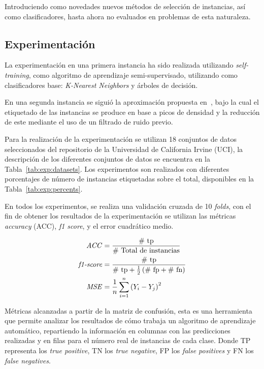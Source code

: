 Introduciendo como novedades nuevos métodos de selección de instancias, así como clasificadores, hasta ahora no evaluados en problemas de esta naturaleza.

\subsection{Experimentación}
La experimentación en una primera instancia ha sido realizada utilizando \textit{self-training}, como algoritmo de aprendizaje semi-supervisado, utilizando como clasificadores base: \textit{K-Nearest Neighbors} y árboles de decisión. 

En una segunda instancia se siguió la aproximación propuesta en~\cite{li2019selfk}, bajo la cual el etiquetado de las instancias se produce en base a picos de densidad y la reducción de este mediante el uso de un filtrado de ruido previo.

Para la realización de la experimentación se utilizan 18 conjuntos de datos seleccionados del repositorio de la Universidad de California Irvine (UCI), la descripción de los diferentes conjuntos de datos se encuentra en la Tabla~\ref{tab:exp:datasets}. Los experimentos son realizados con diferentes porcentajes de número de instancias etiquetadas sobre el total, disponibles en la Tabla~\ref{tab:exp:percents}.

En todos los experimentos, se realiza una validación cruzada de 10 \textit{folds}, con el fin de obtener los resultados de la experimentación se utilizan las métricas \textit{accuracy} (ACC), \textit{f1 score}, y el error cuadrático medio.

\begin{align}
\text{\textit{ACC}} & = \frac{\text{\# tp}}{\text{\# Total de instancias}} \\
\text{\textit{f1-score}} & = \frac{\text{\# tp}}{\text{\# tp} + \frac{1}{2}\left( \text{\# fp} + \text{\# fn}\right)} \\
\text{\textit{MSE}} & = \frac{1}{n} \sum_{i=1}^{n}\left(Y_i - Y_j\right)^2
\end{align}

\noindent Métricas alcanzadas a partir de la matriz de confusión, esta es una herramienta que permite analizar los resultados de cómo trabaja un algoritmo de aprendizaje automático, repartiendo la información en columnas con las predicciones realizadas y en filas para el número real de instancias de cada clase. 
Donde TP representa los \textit{true positive}, TN los \textit{true negative}, FP los \textit{false positives} y FN los \textit{false negatives}. 

